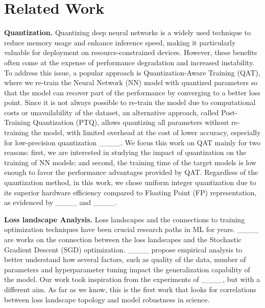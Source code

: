 \section{Related Work}
\label{sec:related-works}
\textbf{Quantization.} Quantizing deep neural networks is a widely used technique to reduce memory usage and enhance inference speed, making it particularly valuable for deployment on resource-constrained devices. However, these benefits often come at the expense of performance degradation and increased instability. To address this issue, a popular approach is Quantization-Aware Training (QAT), where we re-train the Neural Network (NN) model with quantized parameters so that the model can recover part of the performance by converging to a better loss point. Since it is not always possible to re-train the model due to computational costs or unavailability of the dataset, an alternative approach, called Post-Training Quantization (PTQ), allows quantizing all parameters without re-training the model, with limited overhead at the cost of lower accuracy, especially for low-precision quantization ____. We focus this work on QAT mainly for two reasons: first, we are interested in studying the impact of quantization on the training of NN models; and second, the training time of the target models is low enough to favor the performance advantages provided by QAT. Regardless of the quantization method, in this work, we chose uniform integer quantization due to its superior hardware efficiency compared to Floating Point (FP) representation, as evidenced by ____ and ____.

\textbf{Loss landscape Analysis.} Loss landscapes and the connections to training optimization techniques have been crucial research paths in ML for years. ____ are works on the connection between the loss landscapes and the Stochastic Gradient Descent (SGD) optimization. ____ propose empirical analysis to better understand how several factors, such as quality of the data, number of parameters and hyperparameter tuning impact the generalization capability of the model. Our work took inspiration from the experiments of ____, but with a different aim. As far as we know, this is the first work that looks for correlations between loss landscape topology and model robustness in science.

